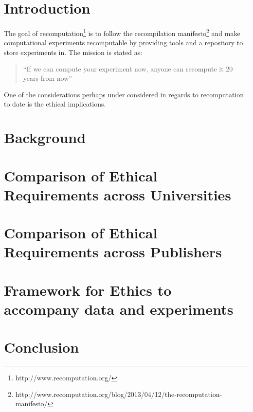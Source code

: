 \documentclass[12pt]{article}
\begin{document}
\maketitle

\section{Introduction}
The goal of recomputation\footnote{http://www.recomputation.org/} is to follow the recompilation manifesto\footnote{http://www.recomputation.org/blog/2013/04/12/the-recomputation-manifesto/} and make computational experiments recomputable by providing tools and a repository to store experiments in. The mission is stated as:
\begin{quote}
``If we can compute your experiment now, anyone can recompute it 20 years from now''
\end{quote}

One of the considerations perhaps under considered in regards to recomputation to date is the ethical implications. 
\section{Background}

\section{Comparison of Ethical Requirements across Universities}

\section{Comparison of Ethical Requirements across Publishers}

\section{Framework for Ethics to accompany data and experiments}

\section{Conclusion}
\end{document}
